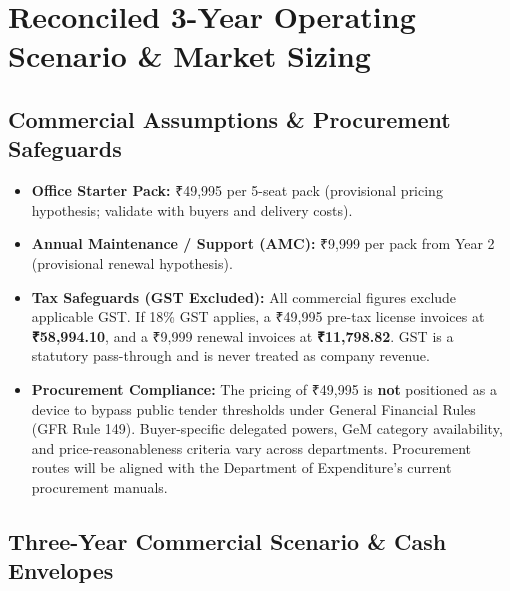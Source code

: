 \documentclass[11pt,a4paper]{article}
\begin{document}
\section{Reconciled 3-Year Operating Scenario \& Market Sizing}

\subsection{Commercial Assumptions \& Procurement Safeguards}
\begin{itemize}[noitemsep,topsep=0pt]
    \item \textbf{Office Starter Pack:} ₹49,995 per 5-seat pack (provisional pricing hypothesis; validate with buyers and delivery costs).
    \item \textbf{Annual Maintenance / Support (AMC):} ₹9,999 per pack from Year 2 (provisional renewal hypothesis).
    \item \textbf{Tax Safeguards (GST Excluded):} All commercial figures exclude applicable GST. If 18\% GST applies, a ₹49,995 pre-tax license invoices at \textbf{₹58,994.10}, and a ₹9,999 renewal invoices at \textbf{₹11,798.82}. GST is a statutory pass-through and is never treated as company revenue.
    \item \textbf{Procurement Compliance:} The pricing of ₹49,995 is \textbf{not} positioned as a device to bypass public tender thresholds under General Financial Rules (GFR Rule 149). Buyer-specific delegated powers, GeM category availability, and price-reasonableness criteria vary across departments. Procurement routes will be aligned with the Department of Expenditure’s current procurement manuals.
\end{itemize}

\vspace{0.15cm}
\subsection{Three-Year Commercial Scenario \& Cash Envelopes}
\end{document}
